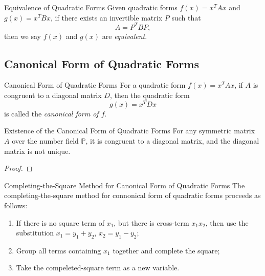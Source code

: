 \begin{definition}{Equivalence of Quadratic Forms}{}
  Given quadratic forms $f(x) = x^TAx$ and $g(x) = x^TBx$,
  if there exists an invertible matrix $P$ such that
  \begin{equation}
    A = P^T B P,
  \end{equation}
  then we say $f(x)$ and $g(x)$ are \emph{equivalent}.
\end{definition}

\subsection{Canonical Form of Quadratic Forms}

\begin{definition}{Canonical Form of Quadratic Forms}{}
  For a quadratic form $f(x) = x^TAx$,
  if $A$ is congruent to a diagonal matrix $D$,
  then the quadratic form
  \begin{equation}
    g(x) = x^T Dx
  \end{equation}
  is called the \emph{canonical form of $f$}.
\end{definition}

\begin{theorem}{Existence of the Canonical Form of Quadratic Forms}{}
  For any symmetric matrix $A$ over the number field $\mathbb{P}$,
  it is congruent to a diagonal matrix,
  and the diagonal matrix is not unique.
\end{theorem}

\begin{proof}
  
\end{proof}

\begin{proposition}{Completing-the-Square Method for Canonical Form of Quadratic
  Forms}{}
  The completing-the-square method for connonical form of quadratic forms
  proceeds as follows:
  \begin{enumerate}
  \item If there is no square term of $x_1$, but there is cross-term $x_1x_2$,
    then use the substitution $x_1 = y_1 + y_2$, $x_2 = y_1 - y_2$;
  \item Group all terms containing $x_1$ together and complete the square;
  \item Take the compeleted-square term as a new variable.
  \end{enumerate}
\end{proposition}

